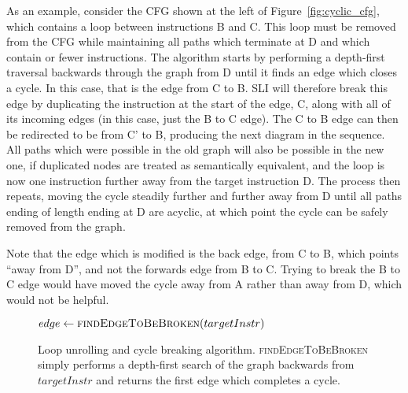 As an example, consider the CFG shown at the left of
Figure~\ref{fig:cyclic_cfg}, which contains a loop between
instructions B and C.  This loop must be removed from the CFG while
maintaining all paths which terminate at D and which contain
\backref{$\alpha$} or fewer instructions.  The algorithm starts by
performing a depth-first traversal backwards through the graph from D
until it finds an edge which closes a cycle.  In this case, that is
the edge from C to B.  SLI will therefore break this edge by
duplicating the instruction at the start of the edge, C, along with
all of its incoming edges (in this case, just the B to C edge).  The C
to B edge can then be redirected to be from C' to B, producing the
next diagram in the sequence.  All paths which were possible in the
old graph will also be possible in the new one, if duplicated nodes
are treated as semantically equivalent, and the loop is now one
instruction further away from the target instruction D.  The process
then repeats, moving the cycle steadily further and further away from
D until all paths ending of length \backref{$\alpha$} ending at D are
acyclic, at which point the cycle can be safely removed from the
graph.

Note that the edge which is modified is the back edge, from C to B,
which points ``away from D'', and not the forwards edge from B to C.
Trying to break the B to C edge would have moved the cycle away from A
rather than away from D, which would not be helpful.

\begin{figure}
\begin{algorithmic}[1]
     \State $edge \gets \textsc{findEdgeToBeBroken}(targetInstr)$
     \Else
        \EndFor
     \EndIf
  \EndWhile
\end{algorithmic}
\caption{Loop unrolling and cycle breaking algorithm.
  \textsc{findEdgeToBeBroken} simply performs a depth-first search of
  the graph backwards from $targetInstr$ and returns the first edge
  which completes a cycle.}
\label{fig:derive:read:unroll_cycle_break}
\end{figure}

